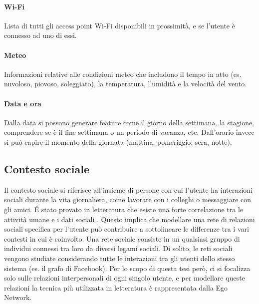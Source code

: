 \documentclass[12pt,italian]{report}
\begin{document}
\paragraph{Wi-Fi} Lista di tutti gli access point Wi-Fi disponibili in prossimità, e se l'utente è connesso ad uno di essi.

\paragraph{Meteo} Informazioni relative alle condizioni meteo che includono il tempo in atto (es. nuvoloso, piovoso, soleggiato), la temperatura, l'umidità e la velocità del vento.

\paragraph{Data e ora} Dalla data si possono generare feature come il giorno della settimana, la stagione, comprendere se è il fine settimana o un periodo di vacanza, etc. Dall'orario invece si può capire il momento della giornata (mattina, pomeriggio, sera, notte).

\subsection{Contesto sociale} \label{subsec:social-context}
Il contesto sociale si riferisce all'insieme di persone con cui l'utente ha interazioni sociali durante la vita giornaliera, come lavorare con i colleghi o messaggiare con gli amici. \'E stato provato in letteratura che esiste una forte correlazione tra le attività umane e i dati sociali \cite{ego-net}. Questo implica che modellare una rete di relazioni sociali specifica per l'utente  può contribuire a sottolineare le differenze tra i vari contesti in cui è coinvolto. Una rete sociale consiste in un qualsiasi gruppo di individui connessi tra loro da diversi legami sociali. Di solito, le reti sociali vengono studiate considerando tutte le interazioni tra gli utenti dello stesso sistema (es. il grafo di Facebook). Per lo scopo di questa tesi però, ci si focalizza solo sulle relazioni interpersonali di ogni singolo utente, e per modellare queste relazioni la tecnica più utilizzata in letteratura è rappresentata dalla Ego Network.
\end{document}
